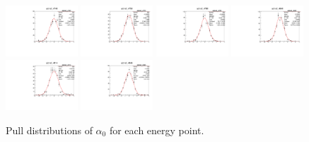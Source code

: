 \begin{figure}[h]
    \includegraphics[width=0.24\textwidth]{figure/io_wo_bkg/polarization/pull_polarization_alpha0_4740.pdf}
    \includegraphics[width=0.24\textwidth]{figure/io_wo_bkg/polarization/pull_polarization_alpha0_4750.pdf}
    \includegraphics[width=0.24\textwidth]{figure/io_wo_bkg/polarization/pull_polarization_alpha0_4780.pdf}
    \includegraphics[width=0.24\textwidth]{figure/io_wo_bkg/polarization/pull_polarization_alpha0_4840.pdf}
    \includegraphics[width=0.24\textwidth]{figure/io_wo_bkg/polarization/pull_polarization_alpha0_4914.pdf}
    \includegraphics[width=0.24\textwidth]{figure/io_wo_bkg/polarization/pull_polarization_alpha0_4946.pdf}
    \caption{Pull distributions of $\alpha_0$ for each energy point.}
\label{fig:io_wo_bkg_pull_alpha0}
\end{figure}

